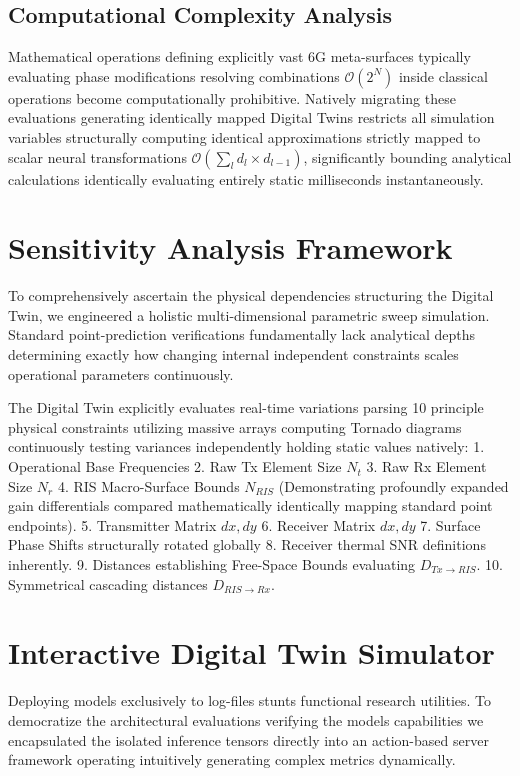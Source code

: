 \documentclass[conference]{IEEEtran}
\begin{document}
\subsection{Computational Complexity Analysis}
Mathematical operations defining explicitly vast 6G meta-surfaces typically evaluating phase modifications resolving combinations $\mathcal{O}(2^N)$ inside classical operations become computationally prohibitive. Natively migrating these evaluations generating identically mapped Digital Twins restricts all simulation variables structurally computing identical approximations strictly mapped to scalar neural transformations $\mathcal{O}(\sum_{l} d_{l} \times d_{l-1})$, significantly bounding analytical calculations identically evaluating entirely static milliseconds instantaneously.

\section{Sensitivity Analysis Framework}

To comprehensively ascertain the physical dependencies structuring the Digital Twin, we engineered a holistic multi-dimensional parametric sweep simulation. Standard point-prediction verifications fundamentally lack analytical depths determining exactly how changing internal independent constraints scales operational parameters continuously. 

The Digital Twin explicitly evaluates real-time variations parsing 10 principle physical constraints utilizing massive arrays computing Tornado diagrams continuously testing variances independently holding static values natively:
1. Operational Base Frequencies
2. Raw Tx Element Size $N_t$
3. Raw Rx Element Size $N_r$
4. RIS Macro-Surface Bounds $N_{RIS}$ (Demonstrating profoundly expanded gain differentials compared mathematically identically mapping standard point endpoints).
5. Transmitter Matrix $dx, dy$
6. Receiver Matrix $dx, dy$
7. Surface Phase Shifts structurally rotated globally
8. Receiver thermal SNR definitions inherently.
9. Distances establishing Free-Space Bounds evaluating $D_{Tx \rightarrow RIS}$.
10. Symmetrical cascading distances $D_{RIS \rightarrow Rx}$.

\section{Interactive Digital Twin Simulator}

Deploying models exclusively to log-files stunts functional research utilities. To democratize the architectural evaluations verifying the models capabilities we encapsulated the isolated inference tensors directly into an action-based server framework operating intuitively generating complex metrics dynamically.
\end{document}
